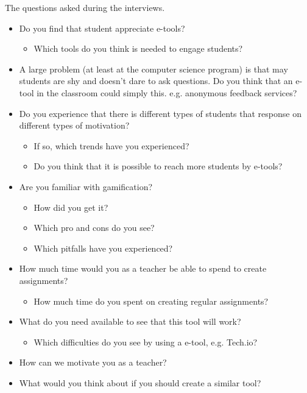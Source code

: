 The questions asked during the interviews.\\
\begin{itemize}
 \item Do you find that student appreciate e-tools?
 \begin{itemize}
 \item Which tools do you think is needed to engage students?
 \end{itemize}
 
 \item A large problem (at least at the computer science program) is that may students are shy and doesn't dare to ask questions. Do you think that an e-tool in the classroom could simply this. e.g. anonymous feedback services? 

 
 \item Do you experience that there is different types of students that response on different types of motivation?
 \begin{itemize}
 \item If so, which trends have you experienced?
 \item Do you think that it is possible to reach more students by e-tools?
 \end{itemize}
 
 \item Are you familiar with gamification?
 \begin{itemize}
 \item How did you get it?
 \item Which pro and cons do you see?
 \item Which pitfalls have you experienced?
 \end{itemize}
 
 \item  How much time would you as a teacher be able to spend to create assignments?
 \begin{itemize}
 \item How much time do you spent on creating regular assignments?
 \end{itemize}
 
 \item What do you need available to see that this tool will work?
 \begin{itemize}
 \item Which difficulties do you see by using a e-tool, e.g. Tech.io?
 \end{itemize}
\item How can we motivate you as a teacher?
\item What would you think about if you should create a similar tool?

\end{itemize}

